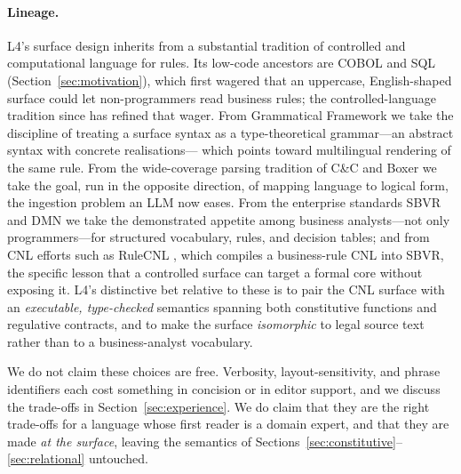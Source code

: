 \documentclass[sigconf,nonacm]{acmart}
\begin{document}
\paragraph{Lineage.}
L4's surface design inherits from a substantial tradition of controlled and
computational language for rules. Its low-code ancestors are COBOL and SQL
(Section~\ref{sec:motivation}), which first wagered that an uppercase,
English-shaped surface could let non-programmers read business rules; the
controlled-language tradition since has refined that wager. From Grammatical
Framework
\cite{ranta2004gf} we take the discipline of treating a surface syntax as a
type-theoretical grammar---an abstract syntax with concrete realisations---
which points toward multilingual rendering of the same rule. From the
wide-coverage parsing tradition of C\&C and Boxer \cite{curran2007cc,
bos2008boxer} we take the goal, run in the opposite direction, of mapping
language to logical form, the ingestion problem an LLM now eases. From the
enterprise standards SBVR \cite{omg_sbvr} and DMN \cite{omg_dmn} we take the
demonstrated appetite among business analysts---not only programmers---for
structured vocabulary, rules, and decision tables; and from CNL efforts such
as RuleCNL \cite{feuto2014rulecnl}, which compiles a business-rule CNL into
SBVR, the specific lesson that a controlled surface can target a formal core
without exposing it. L4's distinctive bet relative to these is to pair the
CNL surface with an \emph{executable, type-checked} semantics spanning both
constitutive functions and regulative contracts, and to make the surface
\emph{isomorphic} to legal source text rather than to a business-analyst
vocabulary.

We do not claim these choices are free. Verbosity, layout-sensitivity, and
phrase identifiers each cost something in concision or in editor support,
and we discuss the trade-offs in Section~\ref{sec:experience}. We do claim
that they are the right trade-offs for a language whose first reader is a
domain expert, and that they are made \emph{at the surface}, leaving the
semantics of Sections~\ref{sec:constitutive}--\ref{sec:relational}
untouched.

\end{document}
